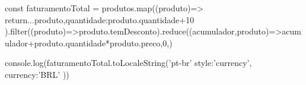 const faturamentoTotal = produtos.map((produto)=>{
    return{...produto,quantidade:produto.quantidade+10}
}).filter((produto)=>produto.temDesconto).reduce((acumulador,produto)=>acumulador+produto.quantidade*produto.preco,0,)

console.log(faturamentoTotal.toLocaleString('pt-br'{
    style:'currency',
    currency:'BRL'
}))